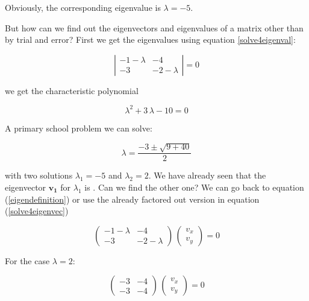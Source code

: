 \documentclass[12pt]{article}
\begin{document}
Obviously, the corresponding eigenvalue is $\lambda=-5$.

But how can we find out the eigenvectors and eigenvalues of a matrix other than by trial and error? First we get the eigenvalues using equation \ref{solve4eigenval}:

\begin{equation}
  \left|\begin{matrix} -1-\lambda & -4\\ -3 & -2-\lambda\end{matrix} \right| = 0 \nonumber
\end{equation}

we get the characteristic polynomial

\begin{equation}
	\lambda^2  +3 \,  \lambda  - 10 = 0 \nonumber
\end{equation}

A primary school problem we can solve:

\begin{equation}
	\lambda= \frac{-3 \pm \sqrt{9+40}}{2} \nonumber
\end{equation}

with two solutions $\lambda_1=-5$ and $\lambda_2=2$. We have already seen that the eigenvector $\mathbf{v_1}$ for $\lambda_1$ is . Can we find the other one? We can go back to equation (\ref{eigendefinition}) or use the already factored out version in equation  (\ref{solve4eigenvec})

\begin{equation}
\begin{pmatrix} -1-\lambda & -4\\ -3 & -2-\lambda\end{pmatrix} \, \begin{pmatrix} v_x \\  v_y\end{pmatrix} = 0 \nonumber
\end{equation}

For the case $\lambda = 2$:

\begin{equation}
	\begin{pmatrix} -3 & -4\\ -3 & -4\end{pmatrix} \, \begin{pmatrix} v_x \\  v_y\end{pmatrix} = 0 \nonumber
\end{equation}
\end{document}
